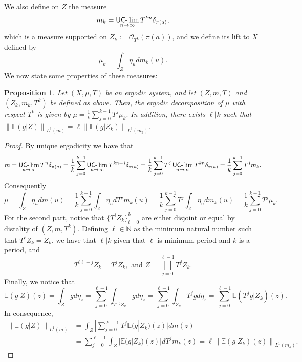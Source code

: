 \documentclass[letter,11pt]{article}
\newtheorem{prop}[theo]{Proposition}
\theoremstyle{definition}
\newcommand{\N}{\mathbb{N}}
\newcommand{\E}{\mathbb{E}}
\newcommand{\norm}[1]{\left\lVert#1\right\rVert}
\newcommand{\uclim}{\mathop{\textup{\textsf{UC-}}\lim}}
\begin{document}
  We also define on $Z$ the measure $$m_k=\uclim_{n\to \infty} T^{kn}\delta_{\pi(a)},$$ which is a measure supported on $Z_k:=\overline{\mathcal{O}_{T^k}(\pi(a))}$, and we define its lift to $X$ defined by $$\mu_k=\int_Z \eta_u dm_k(u).$$
We now state some properties of these measures:
    \begin{prop}\label{ergodic-decom-Tk}
    Let $(X,\mu,T)$ be an ergodic system, and let $(Z,m,T)$ and $(Z_k,m_k,T^k)$ be defined as above. Then, the ergodic decomposition of $\mu$ with respect $T^k$ is given by $\mu= \frac{1}{k}\sum_{j=0}^{k-1}  T^j\mu_k.$ In addition,  there exists $\ell|k$ such that $ \norm{\E(g | Z)}_{L^1(m)}=  \ell  \norm{\E( g | Z_k)}_{L^1(m_k)}.$
    \end{prop}
    \begin{proof}
     By unique ergodicity we have that 
    \begin{equation*}
        m= \uclim_{n\to \infty} T^n\delta_{\pi(a)} = \frac{1}{k}\sum_{j=0}^{k-1}  \uclim_{n\to \infty }T^{kn+j}\delta_{\pi(a)}= \frac{1}{k}\sum_{j=0}^{k-1} T^j  \uclim_{n\to \infty }T^{kn}\delta_{\pi(a)}= \frac{1}{k}\sum_{j=0}^{k-1} T^jm_k.
    \end{equation*}
    Consequently
    \begin{equation*}
        \mu= \int_Z \eta_u dm(u)=  \frac{1}{k}\sum_{j=0}^{k-1}  \int_Z \eta_u dT^jm_k(u)=  \frac{1}{k}\sum_{j=0}^{k-1}  T^j\int_Z \eta_u dm_k(u)=  \frac{1}{k}\sum_{j=0}^{k-1}  T^j\mu_k.
    \end{equation*}
    For the second part, notice that $\{T^iZ_k\}_{i=0}^{k}$ are either disjoint or equal by distality of $(Z,m,T^k)$. Defining $\ell\in \N$ as the minimum natural number such that $T^\ell Z_k=Z_k$, we have that $\ell|k$ given that $\ell$ is minimum period and $k$ is a period, and 
       \begin{equation*}
           T^{i\ell+j}Z_k=T^{j}Z_k, \text{ and } Z=\bigsqcup_{j=0}^{\ell-1}T^jZ_k.
       \end{equation*}
      Finally, we notice that
    \begin{equation*}
       \E(g | Z)(z)= \int_{Z} g d\eta_z= \sum_{j=0}^{\ell-1} \int_{T^{-j}Z_k} g d\eta_z= \sum_{j=0}^{\ell-1} \int_{Z_k} T^jg d\eta_{z} = \sum_{j=0}^{\ell-1} \E( T^jg | Z_k)(z).
    \end{equation*}  
    In consequence,
      \begin{align*}
           \norm{\E(g | Z)}_{L^1(m)} 
           &= \int_{Z} |\sum_{j=0}^{\ell-1} T^j\E( g | Z_k)(z) | dm(z)       
           \\&=  \sum_{j=0}^{\ell-1}\int_{Z} |\E( g | Z_k)(z) | dT^jm_k(z)=  \ell\norm{\E( g | Z_k)(z)}_{L^1(m_k)}.
      \end{align*}
    \end{proof}
\end{document}

